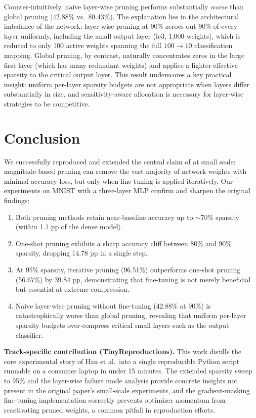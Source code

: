 \documentclass{article}
\begin{document}
Counter-intuitively, naive layer-wise pruning performs substantially \emph{worse} than
global pruning (42.88\% vs.\ 80.43\%).
The explanation lies in the architectural imbalance of the network: layer-wise pruning
at 90\% zeroes out 90\% of every layer uniformly, including the small output layer
(fc3, 1{,}000 weights), which is reduced to only 100 active weights spanning the full
$100 \to 10$ classification mapping.
Global pruning, by contrast, naturally concentrates zeros in the large first layer
(which has many redundant weights) and applies a lighter effective sparsity to the
critical output layer.
This result underscores a key practical insight: uniform per-layer sparsity budgets
are not appropriate when layers differ substantially in size, and sensitivity-aware
allocation is necessary for layer-wise strategies to be competitive.

\section{Conclusion}

We successfully reproduced and extended the central claim of \citet{han2015learning}
at small scale: magnitude-based pruning can remove the vast majority of network weights
with minimal accuracy loss, but only when fine-tuning is applied iteratively.
Our experiments on MNIST with a three-layer MLP confirm and sharpen the original findings:

\begin{enumerate}
  \item Both pruning methods retain near-baseline accuracy up to ${\sim}$70\% sparsity
    (within 1.1 pp of the dense model).
  \item One-shot pruning exhibits a sharp accuracy cliff between 80\% and 90\% sparsity,
    dropping 14.78 pp in a single step.
  \item At 95\% sparsity, iterative pruning (96.51\%) outperforms one-shot pruning
    (56.67\%) by 39.84 pp, demonstrating that fine-tuning is not merely beneficial
    but essential at extreme compression.
  \item Naive layer-wise pruning without fine-tuning (42.88\% at 90\%) is catastrophically
    worse than global pruning, revealing that uniform per-layer sparsity budgets
    over-compress critical small layers such as the output classifier.
\end{enumerate}

\textbf{Track-specific contribution (TinyReproductions).}
This work distills the core experimental story of Han et al.\ into a single reproducible
Python script runnable on a consumer laptop in under 15 minutes.
The extended sparsity sweep to 95\% and the layer-wise failure mode analysis provide
concrete insights not present in the original paper's small-scale experiments, and
the gradient-masking fine-tuning implementation correctly prevents optimizer momentum
from reactivating pruned weights, a common pitfall in reproduction efforts.
\end{document}
